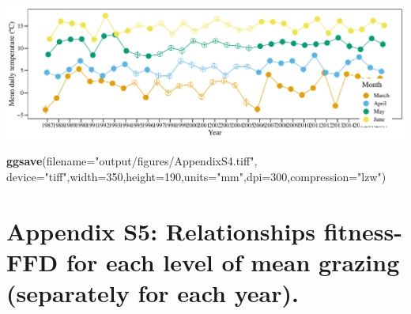 \documentclass[
]{article}
\newenvironment{Shaded}{\begin{snugshade}}{\end{snugshade}}
\newcommand{\DataTypeTok}[1]{\textcolor[rgb]{0.13,0.29,0.53}{#1}}
\newcommand{\DecValTok}[1]{\textcolor[rgb]{0.00,0.00,0.81}{#1}}
\newcommand{\KeywordTok}[1]{\textcolor[rgb]{0.13,0.29,0.53}{\textbf{#1}}}
\newcommand{\NormalTok}[1]{#1}
\newcommand{\StringTok}[1]{\textcolor[rgb]{0.31,0.60,0.02}{#1}}
\begin{document}
\includegraphics{lathyrus_ms3_3_after_rev_Ecology_files/figure-latex/unnamed-chunk-79-1.pdf}

\begin{Shaded}
\begin{Highlighting}[]
\KeywordTok{ggsave}\NormalTok{(}\DataTypeTok{filename=}\StringTok{"output/figures/AppendixS4.tiff"}\NormalTok{,}
       \DataTypeTok{device=}\StringTok{"tiff"}\NormalTok{,}\DataTypeTok{width=}\DecValTok{350}\NormalTok{,}\DataTypeTok{height=}\DecValTok{190}\NormalTok{,}\DataTypeTok{units=}\StringTok{"mm"}\NormalTok{,}\DataTypeTok{dpi=}\DecValTok{300}\NormalTok{,}\DataTypeTok{compression=}\StringTok{"lzw"}\NormalTok{)}
\end{Highlighting}
\end{Shaded}

\hypertarget{appendix-s5-relationships-fitness-ffd-for-each-level-of-mean-grazing-separately-for-each-year.}{%
\section{Appendix S5: Relationships fitness-FFD for each level of mean
grazing (separately for each
year).}\label{appendix-s5-relationships-fitness-ffd-for-each-level-of-mean-grazing-separately-for-each-year.}}
\end{document}
